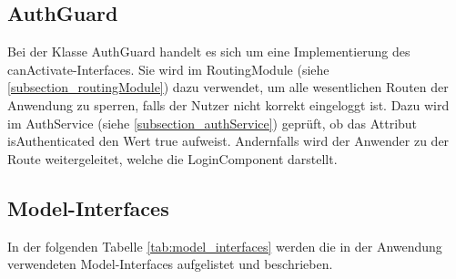 \subsection{AuthGuard}
Bei der Klasse AuthGuard handelt es sich um eine Implementierung des \glqq{}canActivate\grqq{}-Interfaces. Sie wird im RoutingModule (siehe \ref{subsection_routingModule}) dazu verwendet, um alle wesentlichen Routen der Anwendung zu sperren, falls der Nutzer nicht korrekt eingeloggt ist. Dazu wird im AuthService (siehe \ref{subsection_authService}) geprüft, ob das Attribut \glqq{}isAuthenticated\grqq{} den Wert \glqq{}true\grqq{} aufweist. Andernfalls wird der Anwender zu der Route weitergeleitet, welche die LoginComponent darstellt.

\subsection{Model-Interfaces}
In der folgenden Tabelle \ref{tab:model_interfaces} werden die in der Anwendung verwendeten Model-Interfaces aufgelistet und beschrieben.

